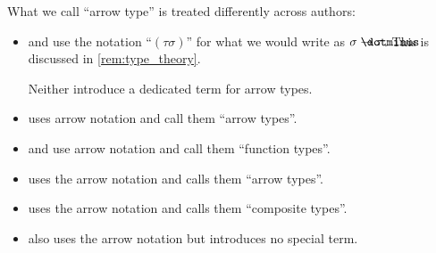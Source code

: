 \begin{remark}\label{rem:arrow_type_name}
  What we call \enquote{arrow type} is treated differently across authors:
  \begin{itemize}
    \item {} and  use the notation \enquote{\( (\tau\sigma) \)} for what we would write as \( \sigma \synimplies \tau \). This is discussed in \cref{rem:type_theory}.

    Neither introduce a dedicated term for arrow types.

    \item {} uses arrow notation and call them \enquote{arrow types}.

    \item {} and  use arrow notation and call them \enquote{function types}.

    \item {} uses the arrow notation and calls them \enquote{arrow types}.

    \item {} uses the arrow notation and calls them \enquote{composite types}.

    \item {} also uses the arrow notation but introduces no special term.
  \end{itemize}
\end{remark}

